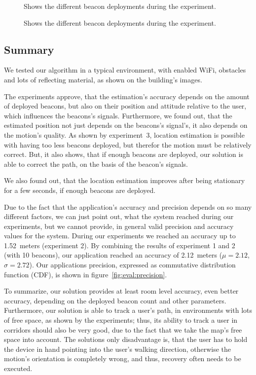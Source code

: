 \begin{figure}
	
	\caption{Shows the different beacon deployments during the experiment.}
	\label{fig:exp3_imgs}
\end{figure}

\begin{figure}
	
	\caption{Shows the different beacon deployments during the experiment.}
\end{figure}


\subsection*{Summary}
We tested our algorithm in a typical environment, with enabled WiFi, obstacles and lots of reflecting material, as shown on the building's images.

The experiments approve, that the estimation's accuracy depends on the amount of deployed beacons, but also on their position and attitude relative to the user, which influences the beacons's signals. Furthermore, we found out, that the estimated position not just depends on the beacons's signal's, it also depends on the motion's quality. As shown by experiment~3, location estimation is possible with having too less beacons deployed, but therefor the motion must be relatively correct. But, it also shows, that if enough beacons are deployed, our solution is able to correct the path, on the basis of the beacon's signals.

We also found out, that the location estimation improves after being stationary for a few seconds, if enough beacons are deployed.

Due to the fact that the application's accuracy and precision depends on so many different factors, we can just point out, what the system reached during our experiments, but we cannot provide, in general valid precision and accuracy values for the system. During our experiments we reached an accuracy up to 1.52~meters (experiment 2). By combining the results of experiment 1 and 2 (with 10 beacons), our application reached an accuracy of 2.12~meters ($\mu=2.12$, $\sigma=2.72$). Our applications precision, expressed as commutative distribution function (CDF), is shown in figure~\ref{fig:eval:precision}.

To summarize, our solution provides at least room level accuracy, even better accuracy, depending on the deployed beacon count and other parameters. Furthermore, our solution is able to track a user's path, in environments with lots of free space, as shown by the experiments; thus, its ability to track a user in corridors should also be very good, due to the fact that we take the map's free space into account. The solutions only disadvantage is, that the user has to hold the device in hand pointing into the user's walking direction, otherwise the motion's orientation is completely wrong, and thus, recovery often needs to be executed.

